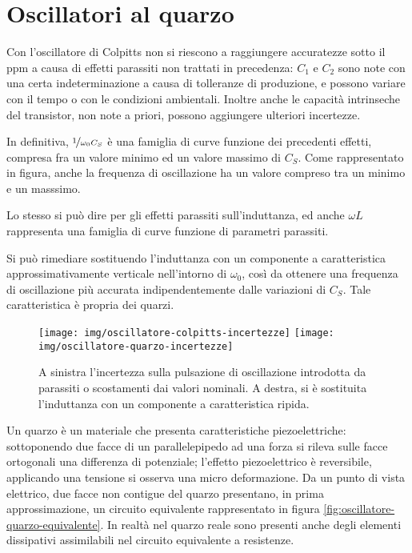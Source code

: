 \section{Oscillatori al quarzo}
Con l'oscillatore di Colpitts non si riescono a raggiungere accuratezze sotto il ppm a causa di effetti parassiti non trattati in precedenza:
$C_1$ e $C_2$ sono note con una certa indeterminazione a causa di tolleranze di produzione, e possono variare con il tempo o con le condizioni ambientali.
Inoltre anche le capacità intrinseche del transistor, non note a priori, possono aggiungere ulteriori incertezze.

In definitiva, $\nicefrac{1}{\omega_0 C_S}$ è una famiglia di curve funzione dei precedenti effetti, compresa fra un valore minimo ed un valore massimo di $C_S$. Come rappresentato in figura, anche la frequenza di oscillazione ha un valore compreso tra un minimo e un masssimo.

Lo stesso si può dire per gli effetti parassiti sull'induttanza, ed anche $\omega L$ rappresenta una famiglia di curve funzione di parametri parassiti.

Si può rimediare sostituendo l'induttanza con un componente a caratteristica approssimativamente verticale nell'intorno di $\omega_0$, così da ottenere una frequenza di oscillazione più accurata indipendentemente dalle variazioni di $C_S$.
Tale caratteristica è propria dei quarzi.

\begin{figure}[hbt]
	\centering
	\texttt{[image: img/oscillatore-colpitts-incertezze]}
	\hfill
	\texttt{[image: img/oscillatore-quarzo-incertezze]}
	\caption{A sinistra l'incertezza sulla pulsazione di oscillazione introdotta da parassiti o scostamenti dai valori nominali. A destra, si è sostituita l'induttanza con un componente a caratteristica ripida.}
	\label{fig:quarzo}
\end{figure}

Un quarzo è un materiale che presenta caratteristiche piezoelettriche: sottoponendo due facce di un parallelepipedo ad una forza si rileva sulle facce ortogonali una differenza di potenziale; l'effetto piezoelettrico è reversibile, applicando una tensione si osserva una micro deformazione. Da un punto di vista elettrico, due facce non contigue del quarzo presentano, in prima approssimazione, un circuito equivalente rappresentato in figura \ref{fig:oscillatore-quarzo-equivalente}. In realtà nel quarzo reale sono presenti anche degli elementi dissipativi assimilabili nel circuito equivalente a resistenze.

